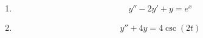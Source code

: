 \documentclass[letterpaper, fontsize=12pt]{scrartcl} %
\numberwithin{equation}{section} %
\numberwithin{figure}{section} %
\numberwithin{table}{section} %
\begin{document}
\begin{enumerate}
\begin{enumerate}[label=(\alph*)]
\item 
\[ y'' - 2y' + y = e^x \]

\item 
\[ y'' + 4y = 4 \csc(2t) \]


\end{enumerate}
\end{enumerate}
\end{document}
